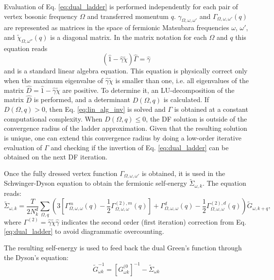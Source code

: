 \documentclass[3p,times,procedia]{elsarticle}
\begin{document}
Evaluation of Eq. \ref{eq:dual_ladder} is performed independently for each pair of vertex bosonic frequency $\Omega$ and transferred momentum $q$. 
$\gamma_{\Omega,\omega,\omega'}$ and $\Gamma_{\Omega,\omega,\omega'}(q)$ are represented as matrices in the space of fermionic Matsubara frequencies $\omega$, $\omega'$, and $\tilde\chi_{\Omega,\omega''}(q)$ is a diagonal matrix. 
In the matrix notation for each $\Omega$ and $q$ this equation reads 
\begin{equation}\label{eq:lin_alg_inv}
(\hat 1 - \hat \gamma \tilde \chi)\hat \Gamma  = \hat \gamma
\end{equation} 
and is a standard linear algebra equation.
This equation is physically correct only when the maximum eigenvalue of $\hat \gamma \tilde \chi$ is smaller than one, i.e. all eigenvalues of the matrix $\hat D = \hat 1 - \hat \gamma \tilde \chi$ are positive. 
To determine it, an LU-decomposition of the matrix $\hat D$ is performed, and a determinant $D(\Omega, q)$ is calculated.
If $D(\Omega, q) > 0$, then Eq. \ref{eq:lin_alg_inv} is solved and $\Gamma$ is obtained at a constant computational complexity.
When $D(\Omega, q) \leq 0$, the DF solution is outside of the convergence radius of the ladder approximation.
Given that the resulting solution is unique, one can extend this convergence radius by doing a low-order iterative evaluation of $\Gamma$ and checking if the invertion of Eq. \ref{eq:dual_ladder} can be obtained on the next DF iteration. 
 
Once the fully dressed vertex function $\Gamma_{\Omega,\omega,\omega'}$ is obtained, it is used in the Schwinger-Dyson equation to obtain the fermionic self-energy $\tilde \Sigma_{\omega, k}$. 
The equation reads:
\begin{equation}\label{eq:sd}
\tilde \Sigma_{\omega, k} = \frac{T}{2 N_k^d}  \sum_{\Omega, q} \left( 3 \left[\Gamma^m_{\Omega,\omega,\omega}(q) - \frac{1}{2}\Gamma^{(2), m}_{\Omega,\omega,\omega}(q) \right] + \Gamma^d_{\Omega,\omega,\omega}(q) - \frac{1}{2}\Gamma^{(2), d}_{\Omega,\omega,\omega}(q)  \right) \tilde G_{\omega, k + q},
\end{equation}
where $\Gamma^{(2)} = \hat \gamma \tilde \chi \hat \gamma $ indicates the second order (first iteration) correction from Eq. \ref{eq:dual_ladder} to avoid diagrammatic overcounting. 

The resulting self-energy is used to feed back the dual Green's function through the Dyson's equation:
\begin{equation}\label{eq:dyson}
\tilde G^{-1}_{\omega k} = \left[G^{(0}_{\omega k}\right]^{-1} - \tilde \Sigma_{\omega k}
\end{equation}
\end{document}
